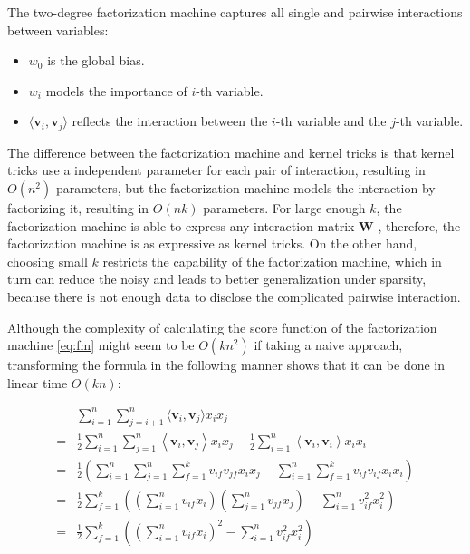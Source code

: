         The two-degree factorization machine captures all single and pairwise interactions between variables:

        \begin{itemize}
            \item $w_0$ is the global bias.
            \item $w_i$ models the importance of $i$-th variable.
            \item $\langle \bm{v}_i, \bm{v}_j \rangle$ reflects the interaction
                between the $i$-th variable and the $j$-th variable.
        \end{itemize}

        The difference between the factorization machine and kernel tricks is that
        kernel tricks use a independent parameter for each pair of interaction, resulting in $O(n^2)$ parameters,
        but the factorization machine models the interaction by factorizing it, resulting in $O(nk)$ parameters.
        For large enough $k$, the factorization machine is able to express any interaction matrix $\bm{W}$ \cite{Rendle2010},
        therefore, the factorization machine is as expressive as kernel tricks.
        On the other hand, choosing small $k$ restricts the capability of the factorization machine,
        which in turn can reduce the noisy and leads to better generalization under sparsity,
        because there is not enough data to disclose the complicated pairwise interaction.

        Although the complexity of calculating the score function of the factorization machine \ref{eq:fm}
        might seem to be $O(kn^2)$ if taking a naive approach,
        transforming the formula in the following manner shows that it can be done in linear time $O(kn)$:

        \begin{align*}
        & \sum_{i=1}^n\sum_{j=i+1}^n \langle \bm{v}_i, \bm{v}_j \rangle x_ix_j \\
        =& \frac { 1} { 2} \sum _ { i = 1} ^ { n } \sum _ { j = 1} ^ { n } \left\langle \bm { v } _ { i } ,\bm { v } _ { j } \right\rangle x _ { i } x _ { j } - \frac { 1} { 2} \sum _ { i = 1} ^ { n } \left\langle \bm { v } _ { i } ,\bm { v } _ { i } \right\rangle x _ { i } x _ { i } \\
        =& \frac { 1} { 2} \left( \sum _ { i = 1} ^ { n } \sum _ { j = 1} ^ { n } \sum _ { f = 1} ^ { k } v _ { if } v _ { jf} x _ { i } x _ { j } - \sum _ { i = 1} ^ { n } \sum _ { f = 1} ^ { k } v _ { if } v _ { if } x _ { i } x _ { i } \right) \\
        =& \frac { 1} { 2} \sum _ { f = 1} ^ { k } \left( \left( \sum _ { i = 1} ^ { n } v _ { if } x _ { i } \right) \left( \sum _ { j = 1} ^ { n } v _ { jf } x _ { j } \right) - \sum _ { i = 1} ^ { n } v _ { if } ^ { 2} x _ { i } ^ { 2} \right) \\
        =& \frac { 1} { 2} \sum _ { f = 1} ^ { k } \left( \left( \sum _ { i = 1} ^ { n } v _ { if } x _ { i } \right) ^ { 2} - \sum _ { i = 1} ^ { n } v _ { if } ^ { 2} x _ { i } ^ { 2} \right)
        \end{align*}

